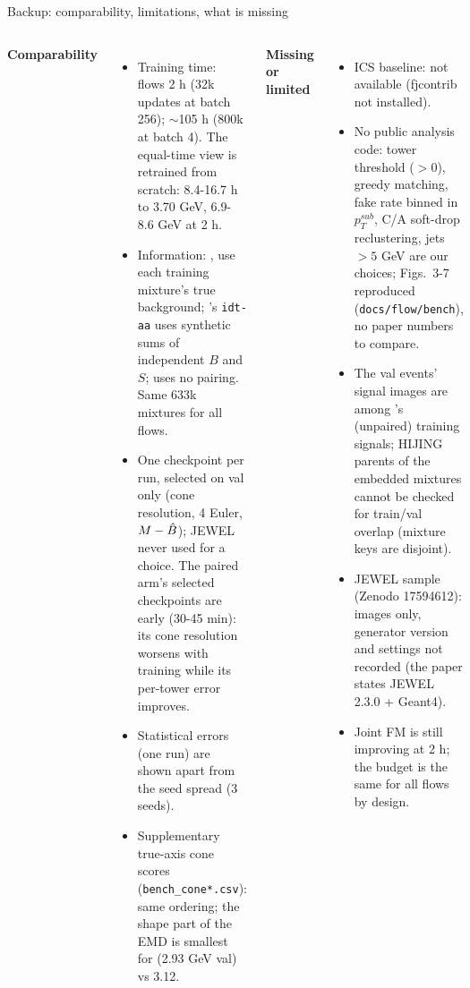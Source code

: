 \begin{frame}{Backup: comparability, limitations, what is missing}
\scriptsize
\begin{columns}[T]
\textbf{Comparability}
\begin{itemize}\setlength\itemsep{0.1em}
\item Training time: flows 2 h (32k updates at batch 256); \uv{} ${\sim}$105 h (800k at batch 4). The
  equal-time view is \uv{} retrained from scratch: 8.4-16.7 h to 3.70 GeV, 6.9-8.6 GeV at 2 h.
\item Information: \pai{}, \jnt{} use each training mixture's true background; \uv{}'s \texttt{idt-aa} uses
  synthetic sums of independent $B$ and $S$; \unp{} uses no pairing. Same 633k mixtures for all flows.
\item One checkpoint per run, selected on val only (cone resolution, 4 Euler, $M - \hat B$); JEWEL never
  used for a choice. The paired arm's selected checkpoints are early (30-45 min): its cone resolution
  worsens with training while its per-tower error improves.
\item Statistical errors (one run) are shown apart from the seed spread (3 seeds).
\item Supplementary true-axis cone scores (\texttt{bench\_cone*.csv}): same ordering; the shape part of
  the EMD is smallest for \pai{} (2.93 GeV val) vs \uv{} 3.12.
\end{itemize}
\textbf{Missing or limited}
\begin{itemize}\setlength\itemsep{0.1em}
\item ICS baseline: not available (fjcontrib not installed).
\item No public analysis code: tower threshold ($>0$), greedy matching, fake rate binned in
  $p_T^{sub}$, C/A soft-drop reclustering, jets $> 5$ GeV are our choices; Figs.\ 3-7 reproduced
  (\texttt{docs/flow/bench}), no paper numbers to compare.
\item The val events' signal images are among \uv{}'s (unpaired) training signals; HIJING parents of
  the embedded mixtures cannot be checked for train/val overlap (mixture keys are disjoint).
\item JEWEL sample (Zenodo 17594612): images only, generator version and settings not recorded
  (the paper states JEWEL 2.3.0 + Geant4).
\item Joint FM is still improving at 2 h; the budget is the same for all flows by design.
\end{itemize}
\end{columns}
\end{frame}

